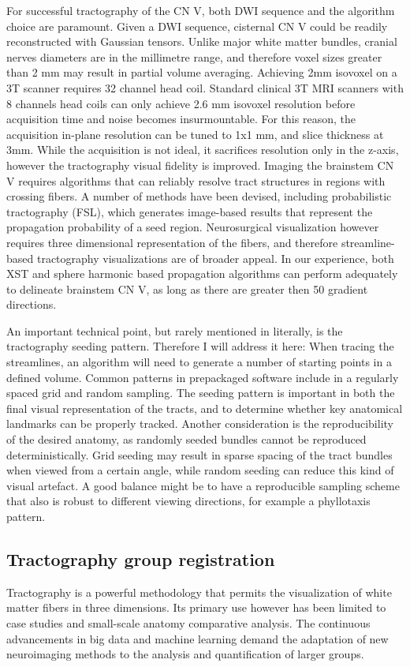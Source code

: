 For successful tractography of the CN V, both DWI sequence and the algorithm choice are paramount. Given a DWI sequence, cisternal CN V could be readily reconstructed with Gaussian tensors. Unlike major white matter bundles, cranial nerves diameters are in the millimetre range, and therefore voxel sizes greater than 2 mm may result in partial volume averaging. Achieving 2mm isovoxel on a 3T scanner requires 32 channel head coil. Standard clinical 3T MRI scanners with 8 channels head coils can only achieve 2.6 mm isovoxel resolution before acquisition time and noise becomes insurmountable. For this reason, the acquisition in-plane resolution can be tuned to 1x1 mm, and slice thickness at 3mm. While the acquisition is not ideal, it sacrifices resolution only in the z-axis, however the tractography visual fidelity is improved. 
Imaging the brainstem CN V requires algorithms that can reliably resolve tract structures in regions with crossing fibers. A number of methods have been devised, including probabilistic tractography (FSL)\cite{Behrens2007}, which generates image-based results that represent the propagation probability of a seed region. Neurosurgical visualization however requires three dimensional representation of the fibers, and therefore streamline-based tractography visualizations are of broader appeal. In our experience, both XST and sphere harmonic based propagation algorithms can perform adequately to delineate brainstem CN V, as long as there are greater then 50 gradient directions. 

An important technical point, but rarely mentioned in literally, is the tractography seeding pattern. Therefore I will address it here: When tracing the streamlines, an algorithm will need to generate a number of starting points in a defined volume. Common patterns in prepackaged software include in a regularly spaced grid and random sampling. The seeding pattern is important in both the final visual representation of the tracts, and to determine whether key anatomical landmarks can be properly tracked. Another consideration is the reproducibility of the desired anatomy, as randomly seeded bundles cannot be reproduced deterministically. Grid seeding may result in sparse spacing of the tract bundles when viewed from a certain angle, while random seeding can reduce this kind of visual artefact. A good balance might be to have a reproducible sampling scheme that also is robust to different viewing directions, for example a phyllotaxis pattern.

\subsection{Tractography group registration}
Tractography is a powerful methodology that permits the visualization of white matter fibers in three dimensions. Its primary use however has been limited to case studies and small-scale anatomy comparative analysis. The continuous advancements in big data and machine learning demand the adaptation of new neuroimaging methods to the analysis and quantification of larger groups.

